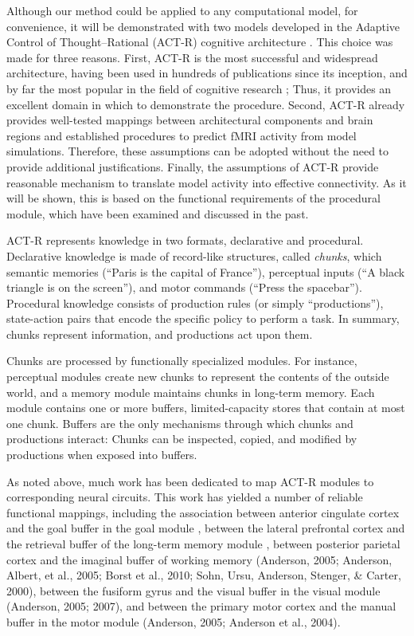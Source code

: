\documentclass[10pt,letterpaper]{article}
\begin{document}
Although our method could be applied to any computational model, for convenience, it will be demonstrated with two models developed in the Adaptive Control of Thought--Rational (ACT-R) cognitive architecture \cite{Anderson2004}. This choice was made for three reasons.  First, ACT-R is the most successful and widespread architecture, having been used in hundreds of publications since its inception, and by far the most popular in the field of cognitive research \cite{Kotseruba2018}; Thus, it provides an excellent domain in which to demonstrate the procedure. Second, ACT-R already provides well-tested mappings between architectural components and brain regions and established procedures to predict fMRI activity from model simulations. Therefore, these assumptions can be adopted without the need to provide additional justifications. Finally, the assumptions of ACT-R provide reasonable mechanism to translate model activity into effective connectivity. As it will be shown, this is based on the functional requirements of the procedural module, which have been examined and discussed in the past.

ACT-R represents knowledge in two formats, declarative and procedural. Declarative knowledge is made of record-like structures, called {\it chunks}, which semantic memories (“Paris is the capital of France”), perceptual inputs (“A black triangle is on the screen”), and motor commands (“Press the spacebar”). Procedural knowledge consists of production rules (or simply ``productions''), state-action pairs that encode the specific policy to perform a task. In summary, chunks represent information, and productions act upon them.

Chunks are processed by functionally specialized modules. For instance, perceptual modules create new chunks to represent the contents of the outside world, and a memory module maintains chunks in long-term memory. Each module contains one or more buffers, limited-capacity stores that contain at most one chunk. Buffers are the only mechanisms through which chunks and productions interact: Chunks can be inspected, copied, and modified by productions when exposed into buffers. 

As noted above, much work has been dedicated to map ACT-R modules to corresponding neural circuits. This work has yielded a number of reliable functional mappings, including the association between anterior cingulate cortex and the goal buffer in the goal module \cite{fincham2006distinct,sohn2007anticipation}, between the lateral prefrontal cortex and the retrieval buffer of the long-term memory module \cite{fincham2006distinct,danker2008rational}, between posterior parietal cortex and the imaginal buffer of working memory (Anderson, 2005; Anderson, Albert, et al., 2005; Borst et al., 2010; Sohn, Ursu, Anderson, Stenger, & Carter, 2000), between the fusiform gyrus and the visual buffer in the visual module (Anderson, 2005; 2007), and between the primary motor cortex and the manual buffer in the motor module (Anderson, 2005; Anderson et al., 2004).
\end{document}
